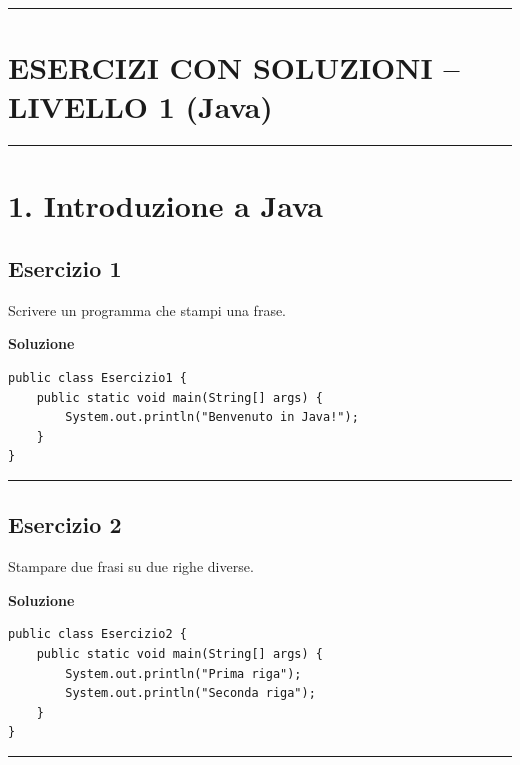 \documentclass[
]{article}
\author{}
\date{}
\begin{document}
\begin{center}\rule{0.5\linewidth}{0.5pt}\end{center}

\section{ESERCIZI CON SOLUZIONI -- LIVELLO 1
(Java)}\label{esercizi-con-soluzioni-livello-1-java}

\begin{center}\rule{0.5\linewidth}{0.5pt}\end{center}

\section{1. Introduzione a Java}\label{introduzione-a-java}

\subsection{Esercizio 1}\label{esercizio-1}

Scrivere un programma che stampi una frase.

\textbf{Soluzione}

\begin{verbatim}
public class Esercizio1 {
    public static void main(String[] args) {
        System.out.println("Benvenuto in Java!");
    }
}
\end{verbatim}

\begin{center}\rule{0.5\linewidth}{0.5pt}\end{center}

\subsection{Esercizio 2}\label{esercizio-2}

Stampare due frasi su due righe diverse.

\textbf{Soluzione}

\begin{verbatim}
public class Esercizio2 {
    public static void main(String[] args) {
        System.out.println("Prima riga");
        System.out.println("Seconda riga");
    }
}
\end{verbatim}

\begin{center}\rule{0.5\linewidth}{0.5pt}\end{center}
\end{document}
